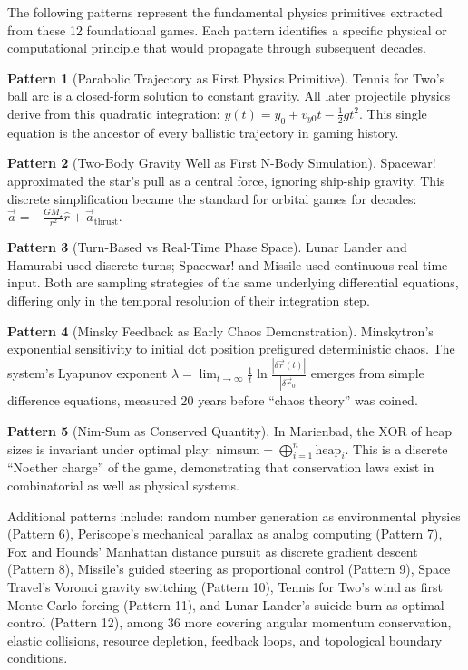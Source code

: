 \documentclass[11pt,a4paper]{article}
\theoremstyle{definition}
\newtheorem{pattern}{Pattern}[section]
\begin{document}
The following patterns represent the fundamental physics primitives extracted from these 12 foundational games. Each pattern identifies a specific physical or computational principle that would propagate through subsequent decades.

\begin{pattern}[Parabolic Trajectory as First Physics Primitive]
Tennis for Two's ball arc is a closed-form solution to constant gravity. All later projectile physics derive from this quadratic integration: $y(t) = y_0 + v_{y0}t - \frac{1}{2}gt^2$. This single equation is the ancestor of every ballistic trajectory in gaming history.
\end{pattern}

\begin{pattern}[Two-Body Gravity Well as First N-Body Simulation]
Spacewar! approximated the star's pull as a central force, ignoring ship-ship gravity. This discrete simplification became the standard for orbital games for decades: $\vec{a} = -\frac{GM_{\star}}{r^2}\hat{r} + \vec{a}_{\text{thrust}}$.
\end{pattern}

\begin{pattern}[Turn-Based vs Real-Time Phase Space]
Lunar Lander and Hamurabi used discrete turns; Spacewar! and Missile used continuous real-time input. Both are sampling strategies of the same underlying differential equations, differing only in the temporal resolution of their integration step.
\end{pattern}

\begin{pattern}[Minsky Feedback as Early Chaos Demonstration]
Minskytron's exponential sensitivity to initial dot position prefigured deterministic chaos. The system's Lyapunov exponent $\lambda = \lim_{t\to\infty}\frac{1}{t}\ln\frac{|\delta\vec{r}(t)|}{|\delta\vec{r}_0|}$ emerges from simple difference equations, measured 20 years before ``chaos theory'' was coined.
\end{pattern}

\begin{pattern}[Nim-Sum as Conserved Quantity]
In Marienbad, the XOR of heap sizes is invariant under optimal play: $\text{nimsum} = \bigoplus_{i=1}^{n}\text{heap}_i$. This is a discrete ``Noether charge'' of the game, demonstrating that conservation laws exist in combinatorial as well as physical systems.
\end{pattern}

Additional patterns include: random number generation as environmental physics (Pattern 6), Periscope's mechanical parallax as analog computing (Pattern 7), Fox and Hounds' Manhattan distance pursuit as discrete gradient descent (Pattern 8), Missile's guided steering as proportional control (Pattern 9), Space Travel's Voronoi gravity switching (Pattern 10), Tennis for Two's wind as first Monte Carlo forcing (Pattern 11), and Lunar Lander's suicide burn as optimal control (Pattern 12), among 36 more covering angular momentum conservation, elastic collisions, resource depletion, feedback loops, and topological boundary conditions.
\end{document}
